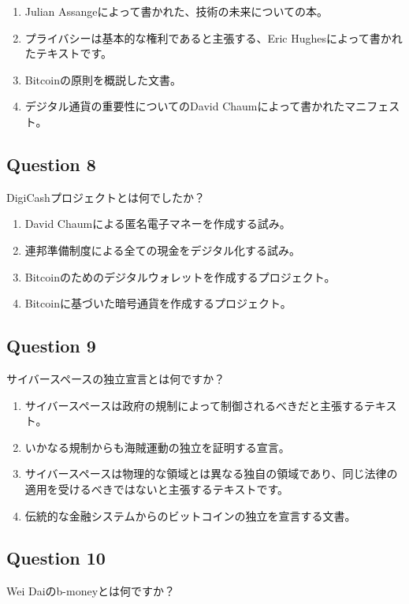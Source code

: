 \documentclass[12pt,a4paper]{article}
\begin{document}
\begin{enumerate}[label=\Alph*., leftmargin=*]
\item Julian Assangeによって書かれた、技術の未来についての本。
\item プライバシーは基本的な権利であると主張する、Eric Hughesによって書かれたテキストです。
\item Bitcoinの原則を概説した文書。
\item デジタル通貨の重要性についてのDavid Chaumによって書かれたマニフェスト。
\end{enumerate}

\bigskip


\subsection*{Question 8}
DigiCashプロジェクトとは何でしたか？

\begin{enumerate}[label=\Alph*., leftmargin=*]
\item David Chaumによる匿名電子マネーを作成する試み。
\item 連邦準備制度による全ての現金をデジタル化する試み。
\item Bitcoinのためのデジタルウォレットを作成するプロジェクト。
\item Bitcoinに基づいた暗号通貨を作成するプロジェクト。
\end{enumerate}

\bigskip


\subsection*{Question 9}
サイバースペースの独立宣言とは何ですか？

\begin{enumerate}[label=\Alph*., leftmargin=*]
\item サイバースペースは政府の規制によって制御されるべきだと主張するテキスト。
\item いかなる規制からも海賊運動の独立を証明する宣言。
\item サイバースペースは物理的な領域とは異なる独自の領域であり、同じ法律の適用を受けるべきではないと主張するテキストです。
\item 伝統的な金融システムからのビットコインの独立を宣言する文書。
\end{enumerate}

\bigskip


\subsection*{Question 10}
Wei Daiのb-moneyとは何ですか？
\end{document}

